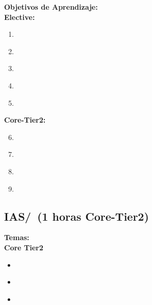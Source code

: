 \noindent \textbf{Objetivos de Aprendizaje:}\\
\noindent \textbf{Elective:}
\begin{enumerate}
	\setcounter{enumi}{0}
	\item \IASNetworkSecurityLODiscussSecurity\xspace[\IASNetworkSecurityLODiscussSecurityLevel]\label{sec:BOK:IASNetworkSecurityLODiscussSecurity}
	\item \IASNetworkSecurityLOIdentifyTheFaced\xspace[\IASNetworkSecurityLOIdentifyTheFacedLevel]\label{sec:BOK:IASNetworkSecurityLOIdentifyTheFaced}
	\item \IASNetworkSecurityLODescribeThreats\xspace[\IASNetworkSecurityLODescribeThreatsLevel]\label{sec:BOK:IASNetworkSecurityLODescribeThreats}
	\item \IASNetworkSecurityLOSummarizeDefenses\xspace[\IASNetworkSecurityLOSummarizeDefensesLevel]\label{sec:BOK:IASNetworkSecurityLOSummarizeDefenses}
	\item \IASNetworkSecurityLODiagram\xspace[\IASNetworkSecurityLODiagramLevel]\label{sec:BOK:IASNetworkSecurityLODiagram}
\end{enumerate}
\noindent \textbf{Core-Tier2:}
\begin{enumerate}
	\setcounter{enumi}{5}
	\item \IASNetworkSecurityLODescribeTheOfAnd\xspace[\IASNetworkSecurityLODescribeTheOfAndLevel]\label{sec:BOK:IASNetworkSecurityLODescribeTheOfAnd}
	\item \IASNetworkSecurityLODescribeThePublic\xspace[\IASNetworkSecurityLODescribeThePublicLevel]\label{sec:BOK:IASNetworkSecurityLODescribeThePublic}
	\item \IASNetworkSecurityLODescribeVirtues\xspace[\IASNetworkSecurityLODescribeVirtuesLevel]\label{sec:BOK:IASNetworkSecurityLODescribeVirtues}
	\item \IASNetworkSecurityLOIdentifyTheMechanism\xspace[\IASNetworkSecurityLOIdentifyTheMechanismLevel]\label{sec:BOK:IASNetworkSecurityLOIdentifyTheMechanism}
\end{enumerate}


\subsection{IAS/\IASCryptography~(1 horas Core-Tier2)}\label{sec:BOK:IASCryptography}
\noindent \textbf{Temas:}\\
\noindent \textbf{Core Tier2}
\begin{itemize}
	\item \IASCryptographyTopicBasic\label{sec:BOK:IASCryptographyTopicBasic}
	\item \IASCryptographyTopicCipher\label{sec:BOK:IASCryptographyTopicCipher}
	\item \IASCryptographyTopicPublic\label{sec:BOK:IASCryptographyTopicPublic}
\end{itemize}

